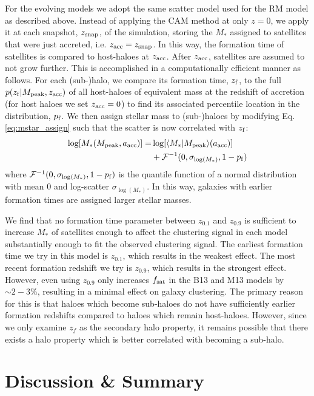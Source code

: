 \documentclass[useAMS,fleqn,usenatbib]{mnras}
\begin{document}
For the evolving models we adopt the same scatter model used for the RM model as described above.  Instead of applying the CAM method at only $z=0$, we apply it at each snapshot, $z_{\rm snap}$, of the simulation, storing the $M_*$ assigned to satellites that were just accreted, i.e. $z_{\rm acc} = z_{\rm snap}$.  In this way, the formation time of satellites is compared to host-haloes at $z_{\rm acc}$.  After $z_{\rm acc}$, satellites are assumed to not grow further.  This is accomplished in a computationally efficient manner as follows.  For each (sub-)halo, we compare its formation time, $z_{\rm f}$, to the full $p(z_{\rm f} | M_{\rm peak}, z_{\rm acc})$ of all host-haloes of equivalent mass at the redshift of accretion (for host haloes we set $z_{\rm acc}=0$) to find its associated percentile location in the distribution, $p_{\rm f}$.  We then assign stellar mass to (sub-)haloes by modifying Eq. \ref{eq:mstar_assign} such that the scatter is now correlated with $z_{\rm f}$:
%
\begin{align}
\log[M_*(M_{\rm peak}, a_{\rm acc})] =& \log[\langle M_* | M_{\rm peak}\rangle(a_{\rm acc})] \\ \nonumber
&+ \mathcal{F}^{-1}(0,\sigma_{\log(M_*)}, 1-p_{\rm f})
\end{align}
%
where $\mathcal{F}^{-1}(0,\sigma_{\log(M_*)}, 1-p_{\rm f})$ is the quantile function of a normal distribution with mean 0 and log-scatter $\sigma_{\log(M_*)}$.  In this way, galaxies with earlier formation times are assigned larger stellar masses. 

We find that no formation time parameter between $z_{0.1}$ and $z_{0.9}$ is sufficient to increase $M_*$ of satellites enough to affect the clustering signal in each model substantially enough to fit the observed clustering signal. The earliest formation time we try in this model is $z_{0.1}$, which results in the weakest effect.  The most recent formation redshift we try is $z_{0.9}$, which results in the strongest effect. However, even using $z_{0.9}$ only increases $f_{\rm sat}$ in the B13 and M13 models by $\sim 2-3\%$, resulting in a minimal effect on galaxy clustering.  The primary reason for this is that haloes which become sub-haloes do not have sufficiently earlier formation redshifts compared to haloes which remain host-haloes.  However, since we only examine $z_f$ as the secondary halo property, it remains possible that there exists a halo property which is better correlated with becoming a sub-halo. 

\section{Discussion \& Summary}
\label{sec:discussion}
\end{document}
